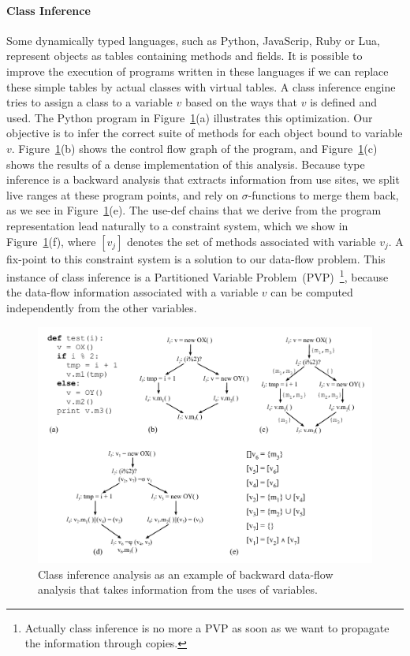 \paragraph{Class Inference} Some dynamically typed languages, such as Python, Java\-Scrip, Ruby or Lua, represent objects as tables containing methods and fields.
It is possible to improve the execution of programs written in these languages if we can replace these simple tables by actual classes with virtual tables.
A class inference engine tries to assign a class to a variable $v$ based on the ways that $v$ is defined and used.
The Python program in Figure~\ref{fig:classInference}(a) illustrates this optimization.
Our objective is to infer the correct suite of methods for each object bound to variable $v$.
Figure~\ref{fig:classInference}(b) shows the control flow graph of the program, and Figure~\ref{fig:classInference}(c) shows the results of a dense implementation of this analysis.
Because type inference is a backward analysis that extracts information from use sites, we split live ranges at these program points, and rely on $\sigma$-functions to merge them back, as we see in Figure~\ref{fig:classInference}(e).
The use-def chains that we derive from the program representation lead naturally to a constraint system, which we show in Figure~\ref{fig:classInference}(f), where $[v_j]$ denotes the set of methods associated with variable $v_j$.
A fix-point to this constraint system is a solution to our data-flow problem.
This instance of class inference is a Partitioned Variable Problem~(PVP)~\footnote{Actually class inference is no more a PVP as soon as we want to propagate the information through copies.}, because the data-flow information associated with a variable $v$ can be computed independently from the other variables.

\begin{figure}[t!]
\centering
\includegraphics[width=\linewidth]{classInference}
\caption{Class inference analysis as an example of backward data-flow analysis that takes information from the uses of variables.}
\label{fig:classInference}
\end{figure}


